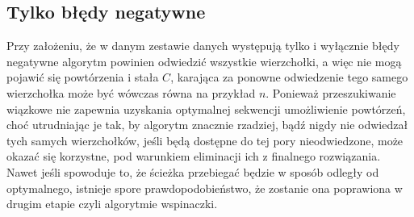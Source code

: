 \documentclass{article}
\begin{document}
\subsection{Tylko błędy negatywne}
Przy założeniu, że w danym zestawie danych występują tylko i wyłącznie błędy negatywne algorytm powinien odwiedzić wszystkie wierzchołki, a więc nie mogą pojawić się powtórzenia i stała $C$, karająca za ponowne odwiedzenie tego samego wierzchołka może być wówczas równa na przykład $n$. Ponieważ przeszukiwanie wiązkowe nie zapewnia uzyskania optymalnej sekwencji umożliwienie powtórzeń, choć utrudniając je tak, by algorytm znacznie rzadziej, bądź nigdy nie odwiedzał tych samych wierzchołków, jeśli będą dostępne do tej pory nieodwiedzone, może okazać się korzystne, pod warunkiem eliminacji ich z finalnego rozwiązania. Nawet jeśli spowoduje to, że ścieżka przebiegać będzie w sposób odległy od optymalnego, istnieje spore prawdopodobieństwo, że zostanie ona poprawiona w drugim etapie czyli algorytmie wspinaczki.
\end{document}
